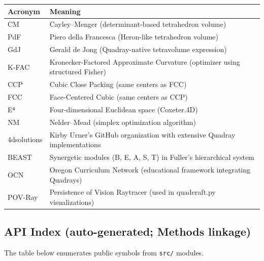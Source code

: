 \documentclass[
  10pt,
]{article}
\newcommand{\passthrough}[1]{#1}
\newcounter{none} %
\begin{document}
{\def\LTcaptype{none} %
\begin{longtable}[]{@{}
  >{\raggedright\arraybackslash}p{}
  >{\raggedright\arraybackslash}p{}@{}}
\toprule\noalign{}
\begin{minipage}[b]{\linewidth}\raggedright
Acronym
\end{minipage} & \begin{minipage}[b]{\linewidth}\raggedright
Meaning
\end{minipage} \\
\midrule\noalign{}
\endhead
\bottomrule\noalign{}
\endlastfoot
CM & Cayley--Menger (determinant-based tetrahedron volume) \\
PdF & Piero della Francesca (Heron-like tetrahedron volume) \\
GdJ & Gerald de Jong (Quadray-native tetravolume expression) \\
K-FAC & Kronecker-Factored Approximate Curvature (optimizer using
structured Fisher) \\
CCP & Cubic Close Packing (same centers as FCC) \\
FCC & Face-Centered Cubic (same centers as CCP) \\
E⁴ & Four-dimensional Euclidean space (Coxeter.4D) \\
NM & Nelder--Mead (simplex optimization algorithm) \\
4dsolutions & Kirby Urner's GitHub organization with extensive Quadray
implementations \\
BEAST & Synergetic modules (B, E, A, S, T) in Fuller's hierarchical
system \\
OCN & Oregon Curriculum Network (educational framework integrating
Quadrays) \\
POV-Ray & Persistence of Vision Raytracer (used in quadcraft.py
visualizations) \\
\end{longtable}
}

\subsection{API Index (auto-generated; Methods
linkage)}\label{api-index-auto-generated-methods-linkage}

The table below enumerates public symbols from
\passthrough{\lstinline!src/!} modules.
\end{document}
